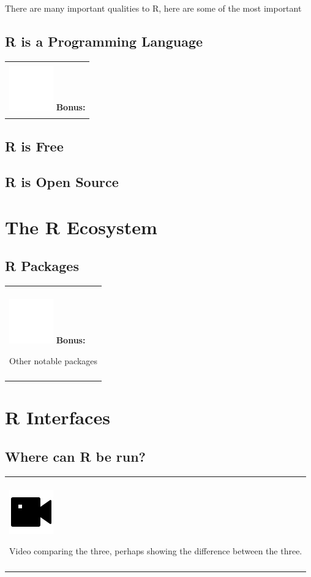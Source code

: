 \documentclass[
]{book}
\newenvironment{bonus}
{
  \begin{center}
  \begin{tabular}{|>{\columncolor{bonus}\color{white}}p{0.9\textwidth}|}\hline\\
  \includegraphics[scale=0.1]{src/images/sun-fill-invert.png}
  \textbf{Bonus:}
}
{\\\\\hline
  \end{tabular}
  \end{center}
}
\newenvironment{video}
{
  \begin{center}
  \begin{tabular}{|>{\columncolor{video}}p{0.9\textwidth}|}
  \hline\\
  \includegraphics[scale=0.1]{src/images/vidicon-fill.png}
}
{\\\\\hline
  \end{tabular}
  \end{center}
}
\begin{document}
There are many important qualities to R, here are some of the most important

\hypertarget{r-is-a-programming-language}{%
\subsection{R is a Programming Language}\label{r-is-a-programming-language}}

\begin{bonus}

\end{bonus}

\hypertarget{r-is-free}{%
\subsection{R is Free}\label{r-is-free}}

\hypertarget{r-is-open-source}{%
\subsection{R is Open Source}\label{r-is-open-source}}

\hypertarget{the-r-ecosystem}{%
\section{The R Ecosystem}\label{the-r-ecosystem}}

\hypertarget{r-packages}{%
\subsection{R Packages}\label{r-packages}}

\begin{bonus}
Other notable packages
\end{bonus}

\hypertarget{r-interfaces}{%
\section{R Interfaces}\label{r-interfaces}}

\hypertarget{where-can-r-be-run}{%
\subsection{Where can R be run?}\label{where-can-r-be-run}}

\begin{video}
Video comparing the three, perhaps showing the difference between the
three.
\end{video}
\end{document}
